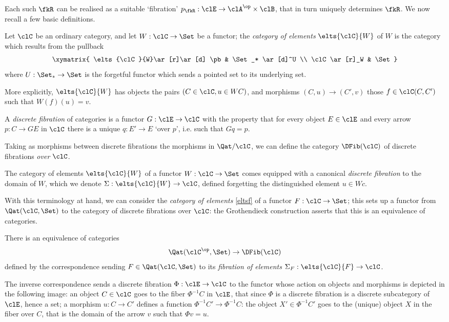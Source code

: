 Each such $\fkR$ can be realised as a suitable `fibration' $p_\fkR : \clE \to \clA^\op\times\clB$, that in turn uniquely determines $\fkR$.
We now recall a few basic definitions.
\begin{definition}\label{eltsf}
	Let $\clC$ be an ordinary category, and let $W : \clC\to \Set$ be a functor; the \emph{category of elements} $\elts{\clC}{W}$ of $W$ is the category which results from the pullback
	\[
		\xymatrix{
			\elts{\clC}{W}\ar[r]\ar[d] \pb & \Set_* \ar[d]^U \\
			\clC \ar[r]_W & \Set
		}
	\]
	where $U : \Set_*\to\Set$ is the forgetful functor which sends a pointed set to its underlying set.

	More explicitly, $\elts{\clC}{W}$ has objects the pairs $(C\in\clC, u\in WC)$, and morphisms $(C,u)\to (C',v)$ those $f\in \clC(C,C')$ such that $W(f)(u)=v$.
\end{definition}
\begin{definition}
	\label{def:dfib}
	A \emph{discrete fibration} of categories is a functor $G : \clE \to \clC$ with the property that for every object $E\in\clE$ and every arrow $p : C\to GE$ in $\clC$ there is a unique $q : E'\to E$ `over $p$', i.e. such that $Gq=p$.
\end{definition}
Taking as morphisms between discrete fibrations the morphisms in $\Qat/\clC$, we can define the category $\DFib(\clC)$ of discrete fibrations \emph{over} $\clC$.
\begin{proposition}\label{fibelem}
	The category of elements $\elts{\clC}{W}$ of a functor $W : \clC\to \Set$ comes equipped with a canonical \emph{discrete fibration} to the domain of $W$, which we denote $\Sigma : \elts{\clC}{W}\to \clC$, defined forgetting the distinguished element $u\in Wc$.
\end{proposition}
With this terminology at hand, we can consider the \emph{category of elements} \ref{eltsf} of a functor $F : \clC\to \Set$; this sets up a functor from $\Qat(\clC,\Set)$ to the category of discrete fibrations over $\clC$: the Grothendieck construction asserts that this is an equivalence of categories.%
\begin{theorem}\label{thm:equconfib}
	There is an equivalence of categories
	\[
		\Qat(\clC^\op,\Set) \to \DFib(\clC)
	\]
	defined by the correspondence sending $F\in\Qat(\clC,\Set)$ to its \emph{fibration of elements}  $\Sigma_F : \elts{\clC}{F} \to \clC$.
\end{theorem}
The inverse correspondence sends a discrete fibration $\Phi : \clE \to \clC$ to the functor whose action on objects and morphisms is depicted in the following image: an object $C\in\clC$ goes to the fiber $\Phi^{-1}C$ in $\clE$, that since $\Phi$ is a discrete fibration is a discrete subcategory of $\clE$, hence a set; a morphism $u : C\to C'$ defines a function $\Phi^{-1}C' \to \Phi^{-1}C$: the object $X'\in\Phi^{-1}C'$ goes to the (unique) object $X$ in the fiber over $C$, that is the domain of the arrow $v$ such that $\Phi v=u$.

